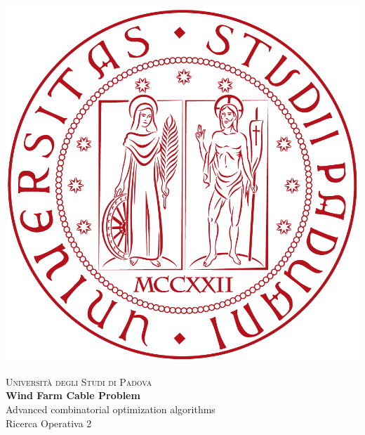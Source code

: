 \begin{titlepage}
    \begin{center}

	\begin{center}
	\includegraphics[scale=0.08]{Graphics/unipd.png}
	\end{center}
	
	\vspace{0.2in}	
	\textsc{\LARGE Università degli Studi di Padova}\\[1.5cm]
    \vspace{1.3in}
    \Huge \textmd{\textbf{Wind Farm Cable Problem}}\\
	\vspace{0.1in}   
    \Large Advanced combinatorial optimization algorithms \\
    \Large Ricerca Operativa 2\\
    \vspace{2in}
		\\
	 	
	
	
  	                    

    \end{center}        
\end{titlepage} 